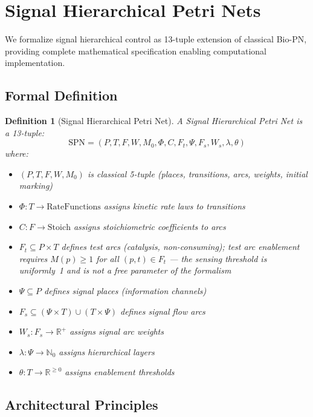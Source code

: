 \documentclass[10pt,letterpaper]{article}
\newtheorem{definition}{Definition}
\begin{document}
\FloatBarrier
\section{Signal Hierarchical Petri Nets}

We formalize signal hierarchical control as 13-tuple extension of classical Bio-PN, providing complete mathematical specification enabling computational implementation.

\subsection{Formal Definition}

\begin{definition}[Signal Hierarchical Petri Net]
A Signal Hierarchical Petri Net is a 13-tuple:
\begin{equation}
\text{SPN} = (P, T, F, W, M_0, \Phi, C, F_t, \Psi, F_s, W_s, \lambda, \theta)
\end{equation}
where:
\begin{itemize}
\item $(P, T, F, W, M_0)$ is classical 5-tuple (places, transitions, arcs, weights, initial marking)
\item $\Phi: T \rightarrow \text{RateFunctions}$ assigns kinetic rate laws to transitions
\item $C: F \rightarrow \text{Stoich}$ assigns stoichiometric coefficients to arcs
\item $F_t \subseteq P \times T$ defines test arcs (catalysis, non-consuming); test arc enablement requires $M(p) \geq 1$ for all $(p,t) \in F_t$ --- the sensing threshold is uniformly~1 and is not a free parameter of the formalism
\item $\Psi \subseteq P$ defines signal places (information channels)
\item $F_s \subseteq (\Psi \times T) \cup (T \times \Psi)$ defines signal flow arcs
\item $W_s: F_s \rightarrow \mathbb{R}^+$ assigns signal arc weights
\item $\lambda: \Psi \rightarrow \mathbb{N}_0$ assigns hierarchical layers
\item $\theta: T \rightarrow \mathbb{R}^{\geq 0}$ assigns enablement thresholds
\end{itemize}
\end{definition}

\subsection{Architectural Principles}
\end{document}
